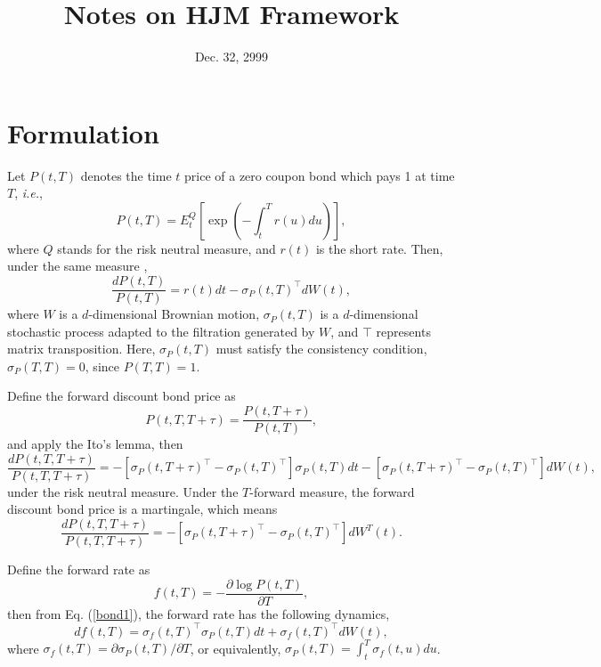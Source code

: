 \documentclass[12pt]{article}
\begin{document}
\title{Notes on HJM Framework}
\date{Dec. 32, 2999}

\maketitle

\section{Formulation}

  Let $P(t,T)$ denotes the time $t$ price of a zero coupon bond which pays 1 at time $T$, {\it i.e.},
  \begin{equation}
    P(t,T)=E_t^Q\left[\exp\left(-\int_t^T r(u)du\right)\right],
    \label{bond0}
  \end{equation}
  where $Q$ stands for the risk neutral measure, and $r(t)$ is the short rate. Then, under the same measure \cite{AP},
  \begin{equation}
    \label{bond1}
    \frac{dP(t,T)}{P(t,T)}=r(t)dt-\sigma_P(t,T)^{{\top}}dW(t),
  \end{equation}
  where $W$ is a $d$-dimensional Brownian motion, $\sigma_P(t,T)$ is a
  $d$-dimensional stochastic process adapted to the filtration generated by $W$,
  and $\top$ represents matrix transposition. Here, $\sigma_P(t,T)$ must
  satisfy the consistency condition, $\sigma_P(T,T)=0$, since $P(T,T)=1$.

  Define the forward discount bond price as
  \begin{equation}
    P(t,T,T+\tau)=\frac{P(t,T+\tau)}{P(t,T)},
  \end{equation}
  and apply the Ito's lemma, then
  \begin{equation}
    \label{bond2}
    \frac{dP(t,T,T+\tau)}{P(t,T,T+\tau)}=-\left[\sigma_P(t,T+\tau)^{\top}-\sigma_P(t,T)^{\top}\right]\sigma_P(t,T)dt
                                        -\left[\sigma_P(t,T+\tau)^{\top}-\sigma_P(t,T)^{\top}\right]dW(t),
  \end{equation}
  under the risk neutral measure. Under the $T$-forward measure, the forward discount bond price is a martingale,
  which means
  \begin{equation}
    \label{bond3}
    \frac{dP(t,T,T+\tau)}{P(t,T,T+\tau)}=-\left[\sigma_P(t,T+\tau)^{\top}-\sigma_P(t,T)^{\top}\right]dW^T(t).
  \end{equation}

  Define the forward rate as
  \begin{equation}
    f(t,T)=-\frac{\partial\log P(t,T)}{\partial T},
  \end{equation}
  then from Eq. (\ref{bond1}), the forward rate has the following dynamics,
  \begin{equation}
    \label{rate}
    df(t,T)=\sigma_f(t,T)^{\top}\sigma_P(t,T)dt+\sigma_f(t,T)^{\top}dW(t),
  \end{equation}
  where $\sigma_f(t,T)=\partial\sigma_P(t,T)/\partial T$, or equivalently,
  $\sigma_P(t,T)=\int_t^T\sigma_f(t,u)du$.
\end{document}
